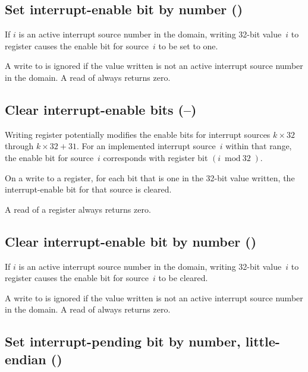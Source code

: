 \subsection{Set interrupt-enable bit by number ()}

If $i$ is an active interrupt source number in the domain, writing
\mbox{32-bit} value~$i$ to register  causes the enable bit
for source~$i$ to be set to one.

A write to  is ignored if the value written is not an
active interrupt source number in the domain.
A read of  always returns zero.

\subsection{%
Clear interrupt-enable bits (--)%
}

Writing register  potentially modifies the
enable bits for interrupt sources $k\times\mbox{32}$ through
${k\times\mbox{32}+\mbox{31}}$.
For an implemented interrupt source~$i$ within that range, the enable
bit for source~$i$ corresponds with register bit ${(i\bmod\mbox{32})}$.

On a write to a  register, for each bit that is one in the
\mbox{32-bit} value written, the interrupt-enable bit for that source
is cleared.

A read of a  register always returns zero.

\subsection{Clear interrupt-enable bit by number ()}

If $i$ is an active interrupt source number in the domain, writing
\mbox{32-bit} value~$i$ to register  causes the enable bit
for source~$i$ to be cleared.

A write to  is ignored if the value written is not an
active interrupt source number in the domain.
A read of  always returns zero.

\subsection{%
Set interrupt-pending bit by number, little-endian ()%
}

